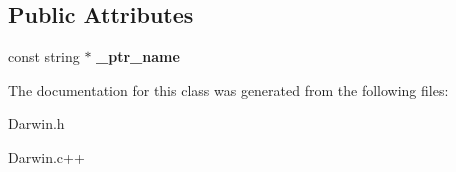 \subsection*{Public Attributes}
\begin{DoxyCompactItemize}
\item 
\hypertarget{class_species_ac7f54dc39c51525d4ace694d3b358650}{const string $\ast$ {\bfseries \-\_\-ptr\-\_\-name}}\label{class_species_ac7f54dc39c51525d4ace694d3b358650}

\end{DoxyCompactItemize}


The documentation for this class was generated from the following files\-:\begin{DoxyCompactItemize}
\item 
Darwin.\-h\item 
Darwin.\-c++\end{DoxyCompactItemize}
